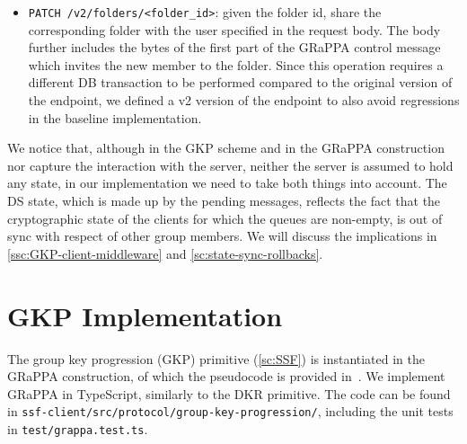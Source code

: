 \begin{itemize}
    \item \texttt{PATCH /v2/folders/<folder\_id>}: given the folder id, share the corresponding folder with the user specified in the request body. The body further includes the bytes of the first part of the GRaPPA control message which invites the new member to the folder. Since this operation requires a different DB transaction to be performed compared to the original version of the endpoint, we defined a v2 version of the endpoint to also avoid regressions in the baseline implementation.
\end{itemize}

We notice that, although in the GKP scheme and in the GRaPPA construction nor capture the
interaction with the server, neither the server
is assumed to hold any state, in our implementation we
need to take both things into account. 
The DS state, which is made up by the pending messages, reflects the fact that
the cryptographic state of the clients for which the queues are non-empty,
is out of sync with respect of other group members.
We will discuss the implications in \cref{ssc:GKP-client-middleware} and \cref{sc:state-sync-rollbacks}.

\section{GKP Implementation}\label{sc:GRaPPA-implementation}

The group key progression (GKP) primitive (\cref{sc:SSF}) is instantiated in the
GRaPPA construction, of which the pseudocode is provided in~\cite{GKP}.
We implement GRaPPA in TypeScript, similarly to the DKR primitive.
The code can be found in \texttt{ssf-client/src/protocol/group-key-progression/},
including the unit tests in \texttt{test/grappa.test.ts}.

